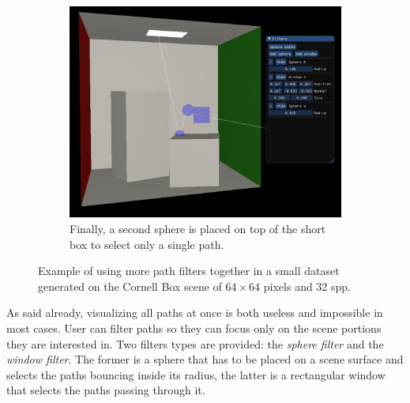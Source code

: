 \begin{figure}
	\begin{subfigure}[t]{0.49\linewidth}
		\includegraphics[width=\textwidth]{chapters/chapter_thetool/filterscombination3.pdf}
		\caption{Finally, a second sphere is placed on top of the short box to select only a single path.}
	\end{subfigure}

	\caption{Example of using more path filters together in a small dataset generated on the Cornell Box scene of $64 \times 64$ pixels and 32 spp.}
	\label{filterstack}
\end{figure}

As said already, visualizing all paths at once is both useless and impossible in most cases. User can filter paths so they can focus only on the scene portions they are interested in. Two filters types are provided: the \textit{sphere filter} and the \textit{window filter}. The former is a sphere that has to be placed on a scene surface and selects the paths bouncing inside its radius, the latter is a rectangular window that selects the paths passing through it.

